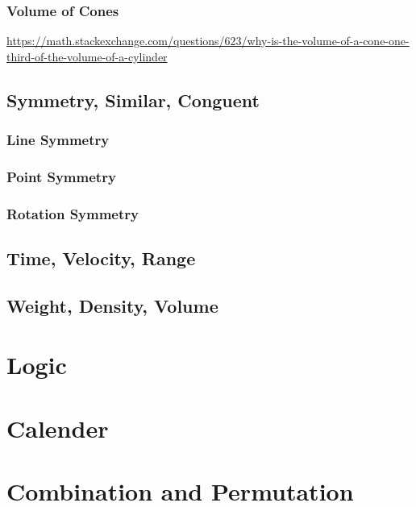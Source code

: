 \subsection{Volume of Cones}
\label{sec:volume-of-cones}
\url{https://math.stackexchange.com/questions/623/why-is-the-volume-of-a-cone-one-third-of-the-volume-of-a-cylinder}

\section{Symmetry, Similar, Conguent}
\label{sec:symmetry-similar-conguent}

\subsection{Line Symmetry}
\label{sec:line-symmetry}

\subsection{Point Symmetry}
\label{sec:point-symmetry}

\subsection{Rotation Symmetry}
\label{sec:rotation-symmetry}


\section{Time, Velocity, Range}
\label{sec:time-velocity-range}

\section{Weight, Density, Volume}
\label{sec:weight-density-volume}


\chapter{Logic}
\label{chap:logic}



\chapter{Calender}
\label{chap:calendar}

\chapter{Combination and Permutation}
\label{chap:combination-and-permutation}

